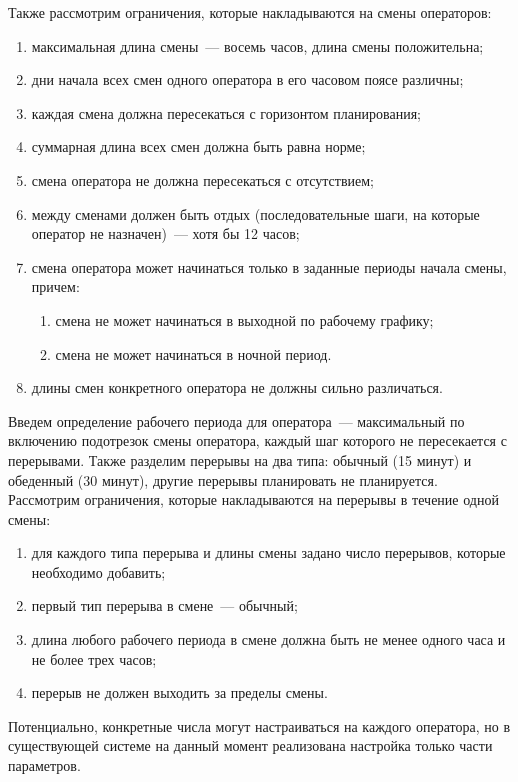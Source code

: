 \documentclass[times,specification,annotation]{itmo-student-thesis}
\begin{document}
Также рассмотрим ограничения, которые накладываются на смены операторов:

\begin{enumerate}
    \item максимальная длина смены~--- восемь часов, длина смены положительна;
    \item дни начала всех смен одного оператора в его часовом поясе различны;
    \item каждая смена должна пересекаться с горизонтом планирования;
    \item суммарная длина всех смен должна быть равна норме;
    \item смена оператора не должна пересекаться с отсутствием;
    \item между сменами должен быть отдых (последовательные шаги, на которые оператор не назначен)~--- хотя бы 12 часов;
    \item смена оператора может начинаться только в заданные периоды начала смены, причем:
    \begin{enumerate}
        \item смена не может начинаться в выходной по рабочему графику;
        \item смена не может начинаться в ночной период.
    \end{enumerate}
    \item длины смен конкретного оператора не должны сильно различаться.
\end{enumerate}

Введем определение рабочего периода для оператора~--- максимальный по включению подотрезок смены оператора, каждый шаг которого не пересекается с перерывами.
Также разделим перерывы на два типа: обычный (15 минут) и обеденный (30 минут), другие перерывы планировать не планируется.
Рассмотрим ограничения, которые накладываются на перерывы в течение одной смены:

\begin{enumerate}
    \item для каждого типа перерыва и длины смены задано число перерывов, которые необходимо добавить;
    \item первый тип перерыва в смене~--- обычный;
    \item длина любого рабочего периода в смене должна быть не менее одного часа и не более трех часов;
    \item перерыв не должен выходить за пределы смены.
\end{enumerate}

Потенциально, конкретные числа могут настраиваться на каждого оператора, но в существующей системе на данный момент реализована настройка только части параметров.
\end{document}

